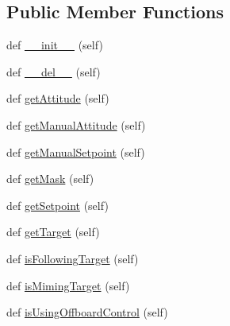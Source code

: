 \subsection*{Public Member Functions}
\begin{DoxyCompactItemize}
\item 
def \mbox{\hyperlink{classwindshape_1_1drone_1_1control_1_1_control_parameters_1_1_control_parameters_a40c43bcc354f6c3734d52dbfb6d18cc9}{\+\_\+\+\_\+init\+\_\+\+\_\+}} (self)
\item 
def \mbox{\hyperlink{classwindshape_1_1drone_1_1control_1_1_control_parameters_1_1_control_parameters_a11248a2febf8398c9ebbe4f18c0a05a4}{\+\_\+\+\_\+del\+\_\+\+\_\+}} (self)
\item 
def \mbox{\hyperlink{classwindshape_1_1drone_1_1control_1_1_control_parameters_1_1_control_parameters_a35899a2ecdd5ac88e9ef5ea079333359}{get\+Attitude}} (self)
\item 
def \mbox{\hyperlink{classwindshape_1_1drone_1_1control_1_1_control_parameters_1_1_control_parameters_ab6ad701a35ea316cbea700d9bceb5c02}{get\+Manual\+Attitude}} (self)
\item 
def \mbox{\hyperlink{classwindshape_1_1drone_1_1control_1_1_control_parameters_1_1_control_parameters_ae6df970b37373aee3b715d9cba8e4417}{get\+Manual\+Setpoint}} (self)
\item 
def \mbox{\hyperlink{classwindshape_1_1drone_1_1control_1_1_control_parameters_1_1_control_parameters_a6ed3aa884c0c62c6bd6716726a26b9dc}{get\+Mask}} (self)
\item 
def \mbox{\hyperlink{classwindshape_1_1drone_1_1control_1_1_control_parameters_1_1_control_parameters_a77ec0624c7be3521665eaab88ff7f6ed}{get\+Setpoint}} (self)
\item 
def \mbox{\hyperlink{classwindshape_1_1drone_1_1control_1_1_control_parameters_1_1_control_parameters_ac904d47cf3e4ac9c71d1d488c1c0c93e}{get\+Target}} (self)
\item 
def \mbox{\hyperlink{classwindshape_1_1drone_1_1control_1_1_control_parameters_1_1_control_parameters_afd4d96aa53b5b60987a8b97fcaed2e92}{is\+Following\+Target}} (self)
\item 
def \mbox{\hyperlink{classwindshape_1_1drone_1_1control_1_1_control_parameters_1_1_control_parameters_a5c55403f152d45380fadd7b2fbabb998}{is\+Miming\+Target}} (self)
\item 
def \mbox{\hyperlink{classwindshape_1_1drone_1_1control_1_1_control_parameters_1_1_control_parameters_ad0c3480f094c11340f97e24245ec539d}{is\+Using\+Offboard\+Control}} (self)

\end{DoxyCompactItemize}
